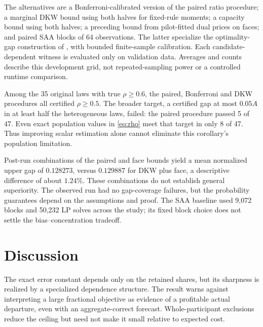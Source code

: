 \documentclass[11pt,a4paper]{article}
\theoremstyle{remark}
\begin{document}
The alternatives are a Bonferroni-calibrated version of the
paired ratio procedure; a marginal DKW bound using both halves
for fixed-rule moments; a capacity bound using both halves;
a preceding bound from pilot-fitted dual prices on faces; and
paired SAA blocks of 64 observations. The latter specialize the
optimality-gap construction of \citet{mak1999montecarlo}, with
bounded finite-sample calibration. Each candidate-dependent
witness is evaluated only on validation data. Averages and
counts describe this development grid, not repeated-sampling
power or a controlled runtime comparison.

\begin{table}[htbp]
\centering

\caption{The 47 heterogeneous positive-share laws at
$M=4096$ pilot plus $M=4096$ validation observations.
The estimand is $D_1-B$. Here $G$ is its upper confidence bound
and $A$ is the maximum declared grand-offer loss.
All six prespecified methods are shown.}
\label{tab:validation}
\end{table}

Among the 35 original laws with true $\rho\ge0.6$, the paired,
Bonferroni and DKW procedures all certified $\rho\ge0.5$.
The broader target, a certified gap at most $0.05A$ in at least
half the heterogeneous laws, failed: the paired procedure passed
5 of 47. Even exact population values in \eqref{eq:rho} meet
that target in only 8 of 47. Thus improving scalar estimation
alone cannot eliminate this corollary's population limitation.

Post-run combinations of the paired and face bounds yield a
mean normalized upper gap of $0.128273$, versus $0.129887$
for DKW plus face, a descriptive difference of about $1.24\%$.
These combinations do not establish general superiority.
The observed run had no gap-coverage failures, but the probability
guarantees depend on the assumptions and proof. The SAA baseline
used 9,072 blocks and 50,232 LP solves across the study; its
fixed block choice does not settle the bias--concentration tradeoff.

\section{Discussion}

The exact error constant depends only on the retained shares,
but its sharpness is realized by a specialized dependence
structure. The result warns against interpreting a large
fractional objective as evidence of a profitable actual departure,
even with an aggregate-correct forecast. Whole-participant
exclusions reduce the ceiling but need not make it small relative
to expected cost.
\end{document}
